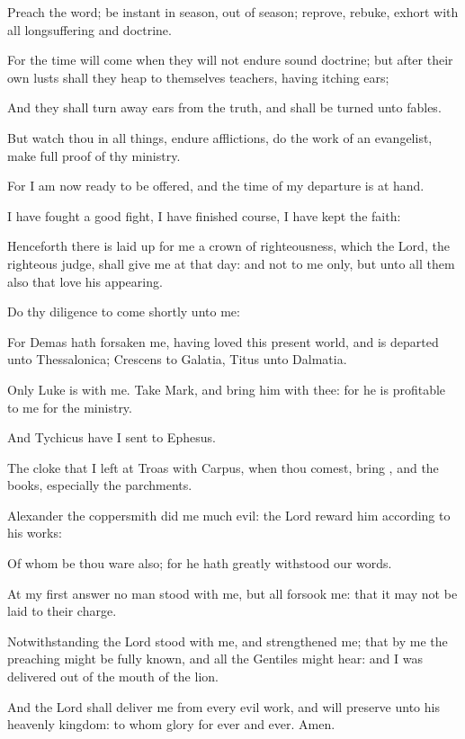 {Preach the
word; be
instant in
season, out of
season;
reprove,
rebuke,
exhort
with
all
longsuffering
and
doctrine.

For the
time will
come
when they
will
not
endure
sound
doctrine;
but
after their
own
lusts shall they
heap to
themselves
teachers, having
itching
ears;

And they shall turn
away
{}
ears
from the
truth,
and shall be
turned
unto
fables.

But
watch
thou
in all
things, endure
afflictions,
do the
work of an
evangelist, make full
proof of
thy
ministry.

For
I
am
now ready to be
offered,
and the
time of
my
departure is at
hand.

I have
fought a
good
fight, I have
finished
{}
course, I have
kept the
faith:

Henceforth there is laid
up for
me a
crown of
righteousness,
which the
Lord, the
righteous
judge, shall
give
me
at
that
day:
and
not to
me
only,
but unto
all
them
also that
love
his
appearing.


\par }{\PP {}Do thy
diligence to
come
shortly
unto
me:

For
Demas hath
forsaken
me, having
loved
this
present
world,
and is
departed
unto
Thessalonica;
Crescens
to
Galatia,
Titus
unto
Dalmatia.

Only
Luke
is
with
me.
Take
Mark,
and
bring him
with
thee:
for he
is
profitable to
me
for the
ministry.

And
Tychicus have I
sent
to
Ephesus.

The
cloke
that I
left
at
Troas
with
Carpus, when thou
comest,
bring
{},
and the
books,
{}
especially the
parchments.

Alexander the
coppersmith
did
me
much
evil: the
Lord
reward
him according
to
his
works:

Of
whom be
thou
ware
also;
for he
hath
greatly
withstood
our
words.

At
my
first
answer no
man stood
with
me,
but
all
{}
forsook
me:
{} that it
may
not be
laid to their
charge.

Notwithstanding the
Lord
stood with
me,
and
strengthened
me;
that
by
me the
preaching might be fully
known,
and
{}
all the
Gentiles might
hear:
and I was
delivered out
of the
mouth of the
lion.

And the
Lord shall
deliver
me
from
every
evil
work,
and will
preserve
{}
unto
his
heavenly
kingdom: to
whom
{}
glory
for
ever and
ever.
Amen.


}
